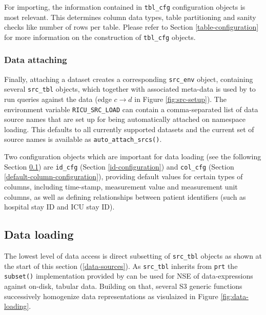 \documentclass[
  notitle]{jss}
\begin{document}
For importing, the information contained in \texttt{tbl\_cfg}
configuration objects is most relevant. This determines column data
types, table partitioning and sanity checks like number of rows per
table. Please refer to Section \ref{table-configuration} for more
information on the construction of \texttt{tbl\_cfg} objects.

\hypertarget{data-attaching}{%
\subsubsection{Data attaching}\label{data-attaching}}

Finally, attaching a dataset creates a corresponding \texttt{src\_env}
object, containing several \texttt{src\_tbl} objects, which together
with associated meta-data is used by  to run queries against
the data (edge \(c \to d\) in Figure \ref{fig:src-setup}). The
environment variable \texttt{RICU\_SRC\_LOAD} can contain a
comma-separated list of data source names that are set up for being
automatically attached on namespace loading. This defaults to all
currently supported datasets and the current set of source names is
available as \texttt{auto\_attach\_srcs()}.

Two configuration objects which are important for data loading (see the
following Section \ref{data-loading}) are \texttt{id\_cfg} (Section
\ref{id-configuration}) and \texttt{col\_cfg} (Section
\ref{default-column-configuration}), providing default values for
certain types of columns, including time-stamp, measurement value and
measurement unit columns, as well as defining relationships between
patient identifiers (such as hospital stay ID and ICU stay ID).

\hypertarget{data-loading}{%
\subsection{Data loading}\label{data-loading}}

The lowest level of data access is direct subsetting of
\texttt{src\_tbl} objects as shown at the start of this section
(\ref{data-sources}). As \texttt{src\_tbl} inherits from \texttt{prt}
the \texttt{subset()} implementation provided by  can be used
for NSE of data-expressions against on-disk, tabular data. Building on
that, several S3 generic functions successively homogenize data
representations as visulaized in Figure \ref{fig:data-loading}.
\end{document}

